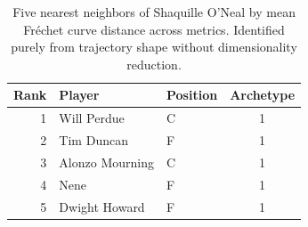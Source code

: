 \begin{table}[htbp]
  \centering\small
  \begin{tabular}{rllc}
    \toprule
    Rank & Player & Position & Archetype \\
    \midrule
    1 & Will Perdue & C & 1 \\
    2 & Tim Duncan & F & 1 \\
    3 & Alonzo Mourning & C & 1 \\
    4 & Nene & F & 1 \\
    5 & Dwight Howard & F & 1 \\
    \bottomrule
  \end{tabular}
  \caption{Five nearest neighbors of Shaquille O'Neal by mean Fr\'{e}chet curve distance across metrics. Identified purely from trajectory shape without dimensionality reduction.}
  \label{tab:Shaquille_O_Neal_frechet_curve_neighbors}
\end{table}

